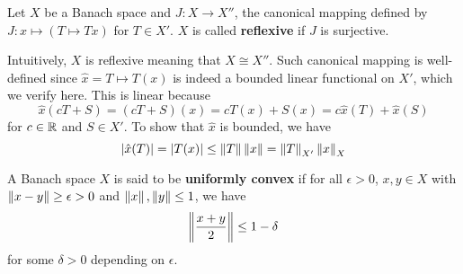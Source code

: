 \begin{definition}
    Let $X$ be a Banach space and $J:X\to X''$, the canonical mapping 
    defined by $J:x\mapsto(T\mapsto Tx)$ for $T\in X'$. $X$ is called 
    \textbf{reflexive} if $J$ is surjective. 
\end{definition}
\begin{remark}
    Intuitively, $X$ is reflexive meaning that $X\cong X''$. Such canonical 
    mapping is well-defined since $\hat{x} = T\mapsto T(x)$ is indeed a bounded linear 
    functional on $X'$, which we verify here. This is linear because 
    \begin{equation*}
        \hat{x}(cT + S) = (cT + S)(x) = cT(x) + S(x) = c\hat{x}(T) + \hat{x}(S)
    \end{equation*}
    for $c\in\mathbb{R}$ and $S\in X'$. To show that $\hat{x}$ is bounded, we have 
    \begin{equation*}
        \left\lvert {\hat{x}(T)} \right\rvert = \left\lvert {T(x)} \right\rvert \leq \left\lVert {T} \right\rVert\left\lVert {x} \right\rVert = \left\lVert {T} \right\rVert_{X'}\left\lVert {x} \right\rVert_{X}
    \end{equation*}
\end{remark}

\begin{definition}
    A Banach space $X$ is said to be \textbf{uniformly convex} if for 
    all $\epsilon>0$, $x,y\in X$ with $\left\lVert {x-y} \right\rVert\geq \epsilon>0$ and 
    $\left\lVert {x} \right\rVert,\left\lVert {y} \right\rVert\leq 1$, we have 
    \begin{equation*}
        \left\lVert {\frac{x+y}{2}} \right\rVert \leq 1-\delta
    \end{equation*}
    for some $\delta>0$ depending on $\epsilon$.
\end{definition}


